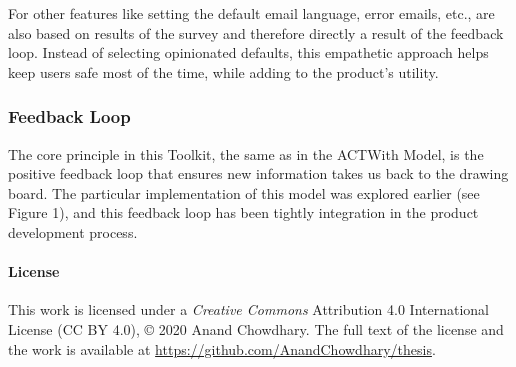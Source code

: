 \documentclass{article}
\begin{document}
For other features like setting the default email language, error emails, etc., are also based on results of the survey and therefore directly a result of the feedback loop. Instead of selecting opinionated defaults, this empathetic approach helps keep users safe most of the time, while adding to the product's utility.

\subsubsection{Feedback Loop}

The core principle in this Toolkit, the same as in the ACTWith Model, is the positive feedback loop that ensures new information takes us back to the drawing board. The particular implementation of this model was explored earlier (see Figure 1), and this feedback loop has been tightly integration in the product development process.




\listoffigures

\paragraph{License}

This work is licensed under a \emph{Creative Commons} Attribution 4.0 International License (CC BY 4.0), © 2020 Anand Chowdhary. The full text of the license and the work is available at \url{https://github.com/AnandChowdhary/thesis}.
\end{document}
